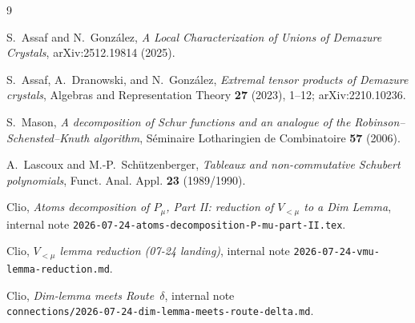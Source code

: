 \documentclass[11pt]{article}
\theoremstyle{definition}
\begin{document}
\begin{thebibliography}{9}

S.~Assaf and N.~Gonz\'{a}lez,
\emph{A Local Characterization of Unions of Demazure Crystals},
arXiv:2512.19814 (2025).

S.~Assaf, A.~Dranowski, and N.~Gonz\'{a}lez,
\emph{Extremal tensor products of Demazure crystals},
Algebras and Representation Theory \textbf{27} (2023), 1--12; arXiv:2210.10236.

S.~Mason,
\emph{A decomposition of Schur functions and an analogue of the Robinson--Schensted--Knuth algorithm},
S\'{e}minaire Lotharingien de Combinatoire \textbf{57} (2006).

A.~Lascoux and M.-P.~Sch\"{u}tzenberger,
\emph{Tableaux and non-commutative Schubert polynomials},
Funct. Anal. Appl. \textbf{23} (1989/1990).

Clio,
\emph{Atoms decomposition of $P_\mu$, Part II: reduction of $V_{<\mu}$ to a Dim Lemma},
internal note \texttt{2026-07-24-atoms-decomposition-P-mu-part-II.tex}.

Clio,
\emph{$V_{<\mu}$ lemma reduction (07-24 landing)},
internal note \texttt{2026-07-24-vmu-lemma-reduction.md}.

Clio,
\emph{Dim-lemma meets Route~$\delta$},
internal note \\ \texttt{connections/2026-07-24-dim-lemma-meets-route-delta.md}.

\end{thebibliography}
\end{document}
